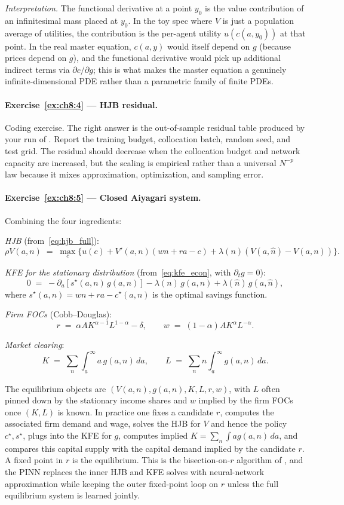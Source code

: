 \documentclass[11pt,a4paper]{report}
\begin{document}
\emph{Interpretation.}  The functional derivative at a point $y_0$ is the value contribution of an infinitesimal mass placed at $y_0$.  In the toy spec where $V$ is just a population average of utilities, the contribution is the per-agent utility $u(c(a, y_0))$ at that point.  In the real master equation, $c(a, y)$ would itself depend on $g$ (because prices depend on $g$), and the functional derivative would pick up additional indirect terms via $\partial c/\partial g$; this is what makes the master equation a genuinely infinite-dimensional PDE rather than a parametric family of finite PDEs.

\paragraph{Exercise~\ref{ex:ch8:4} --- HJB residual.}
Coding exercise.  The right answer is the out-of-sample residual table produced by your run of .  Report the training budget, collocation batch, random seed, and test grid.  The residual should decrease when the collocation budget and network capacity are increased, but the scaling is empirical rather than a universal $N^{-p}$ law because it mixes approximation, optimization, and sampling error.

\paragraph{Exercise~\ref{ex:ch8:5} --- Closed Aiyagari system.}
Combining the four ingredients:

\emph{HJB} (from~\eqref{eq:hjb_full}):
\[
   \rho V(a,n) \;=\; \max_c \bigl\{u(c) + V'(a,n)(wn + ra - c) + \lambda(n)(V(a,\hat n) - V(a,n))\bigr\}.
\]

\emph{KFE for the stationary distribution} (from~\eqref{eq:kfe_econ}, with $\partial_t g = 0$):
\[
   0 \;=\; -\partial_a[s^\star(a,n)\,g(a,n)] - \lambda(n)\,g(a,n) + \lambda(\hat n)\,g(a,\hat n),
\]
where $s^\star(a,n) = wn + ra - c^\star(a,n)$ is the optimal savings function.

\emph{Firm FOCs} (Cobb--Douglas):
\[
   r \;=\; \alpha A K^{\alpha-1} L^{1-\alpha} - \delta,
   \qquad
   w \;=\; (1-\alpha) A K^\alpha L^{-\alpha}.
\]

\emph{Market clearing}:
\[
   K \;=\; \sum_n \int_{\underline a}^\infty a\,g(a,n)\,da,
   \qquad
   L \;=\; \sum_n n \int_{\underline a}^{\infty} g(a,n)\,da.
\]

The equilibrium objects are $(V(a,n),g(a,n),K,L,r,w)$, with $L$ often pinned down by the stationary income shares and $w$ implied by the firm FOCs once $(K,L)$ is known.  In practice one fixes a candidate $r$, computes the associated firm demand and wage, solves the HJB for $V$ and hence the policy $c^\star, s^\star$, plugs into the KFE for $g$, computes implied $K = \sum_n\int a g(a,n)\,da$, and compares this capital supply with the capital demand implied by the candidate $r$.  A fixed point in $r$ is the equilibrium.  This is the bisection-on-$r$ algorithm of \citet{achdou2022income}, and the PINN replaces the inner HJB and KFE solves with neural-network approximation while keeping the outer fixed-point loop on $r$ unless the full equilibrium system is learned jointly.
\end{document}
